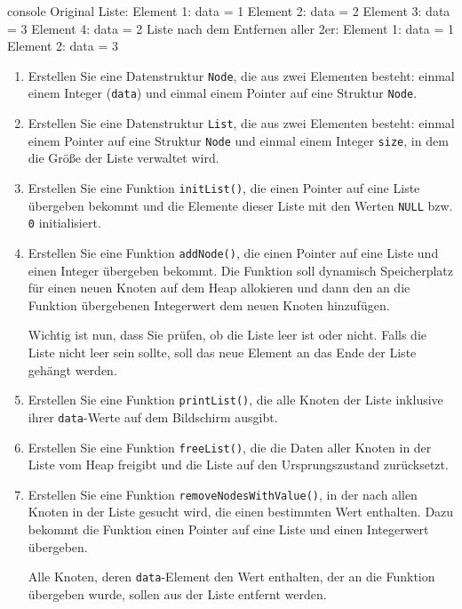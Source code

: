 \begin{mybox}[Bildschirmausgabe]{console}
Original Liste:
Element 1: data = 1
Element 2: data = 2
Element 3: data = 3
Element 4: data = 2
Liste nach dem Entfernen aller 2er:
Element 1: data = 1
Element 2: data = 3
\end{mybox}


\begin{enumerate}
    \item Erstellen Sie eine Datenstruktur \texttt{Node}, die aus zwei
    Elementen besteht: einmal einem Integer (\texttt{data}) und einmal
    einem Pointer auf eine Struktur \texttt{Node}.
    \item Erstellen Sie eine Datenstruktur \texttt{List}, die aus zwei
    Elementen besteht: einmal einem Pointer auf eine Struktur
    \texttt{Node} und einmal einem Integer \texttt{size}, in dem
    die Größe der Liste verwaltet wird.
    \item Erstellen Sie eine Funktion \texttt{initList()}, die einen
    Pointer auf eine Liste übergeben bekommt und die Elemente dieser Liste mit
    den Werten \texttt{NULL} bzw. \texttt{0} initialisiert.
    \item Erstellen Sie eine Funktion \texttt{addNode()}, die einen
    Pointer auf eine Liste und einen Integer übergeben bekommt. Die Funktion
    soll dynamisch Speicherplatz für einen neuen Knoten auf dem Heap allokieren
    und dann den an die Funktion übergebenen Integerwert dem neuen Knoten
    hinzufügen.

    Wichtig ist nun, dass Sie prüfen, ob die Liste leer ist oder nicht. Falls
    die Liste nicht leer sein sollte, soll das neue Element an das Ende der
    Liste gehängt werden.
    \item Erstellen Sie eine Funktion \texttt{printList()}, die alle
    Knoten der Liste inklusive ihrer \texttt{data}-Werte auf dem
    Bildschirm ausgibt.
    \item Erstellen Sie eine Funktion \texttt{freeList()}, die die Daten
    aller Knoten in der Liste vom Heap freigibt und die Liste auf den
    Ursprungszustand zurücksetzt.
    \item Erstellen Sie eine Funktion \texttt{removeNodesWithValue()}, in
    der nach allen Knoten in der Liste gesucht wird, die einen bestimmten Wert
    enthalten. Dazu bekommt die Funktion einen Pointer auf eine Liste und einen
    Integerwert übergeben.

    Alle Knoten, deren \texttt{data}-Element den Wert enthalten, der an
    die Funktion übergeben wurde, sollen aus der Liste entfernt werden.
\end{enumerate}






